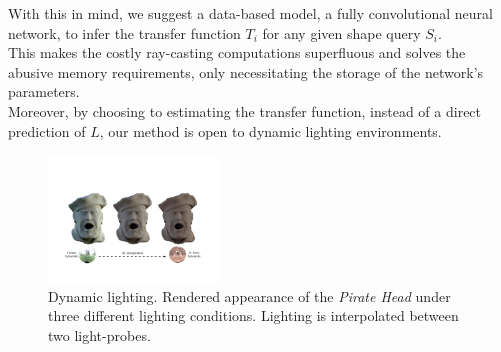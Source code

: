With this in mind, we suggest a data-based model, a fully convolutional neural network, to infer the transfer function $T_i$ for any given shape query $S_i$. \\
This makes the costly ray-casting computations superfluous and solves the abusive memory requirements, only necessitating the storage of the network's parameters. \\
Moreover, by choosing to estimating the transfer function, instead of a direct prediction of $L$, our method is open to  dynamic lighting environments.
\begin{figure}[H]
  \centering
    \includegraphics[width=0.4\textwidth]{Figures/varying_lighting}
     \caption{Dynamic lighting. Rendered appearance of the \textit{Pirate Head} under three different  lighting conditions. Lighting is interpolated between two light-probes.}
     \label{Fig: Varying lighting}
\end{figure}

